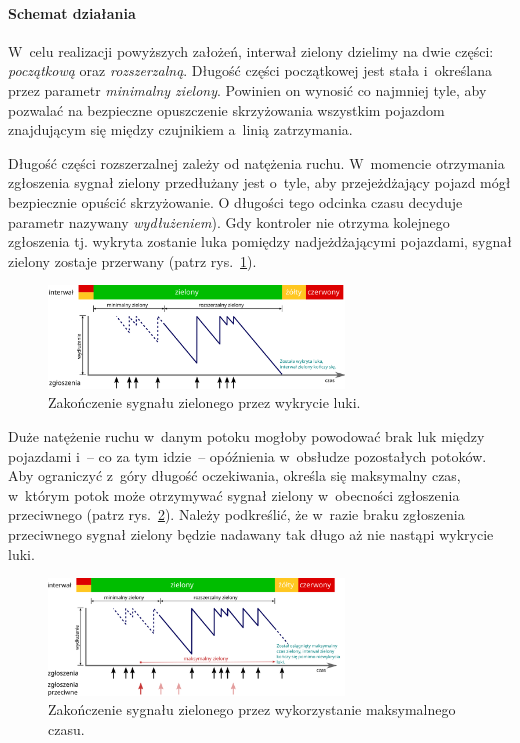\documentclass{pracamgr}
\newcommand{\imgr}[1]{rys.~\ref{#1}}
\theoremstyle{plain}
\begin{document}
\paragraph{Schemat działania} W~celu realizacji powyższych założeń,
interwał zielony dzielimy na dwie części: \emph{początkową} oraz
\emph{rozszerzalną}. Długość części początkowej jest stała i~określana
przez parametr \emph{minimalny zielony}. Powinien on wynosić co
najmniej tyle, aby pozwalać na bezpieczne opuszczenie skrzyżowania
wszystkim pojazdom znajdującym się między czujnikiem a~linią
zatrzymania.

Długość części rozszerzalnej zależy od natężenia ruchu. W~momencie
otrzymania zgłoszenia sygnał zielony przedłużany jest o~tyle, aby
przejeżdżający pojazd mógł bezpiecznie opuścić skrzyżowanie. O
długości tego odcinka czasu decyduje parametr nazywany
\emph{wydłużeniem}). Gdy kontroler nie otrzyma kolejnego
zgłoszenia tj. wykryta zostanie luka pomiędzy nadjeżdżającymi
pojazdami, sygnał zielony zostaje przerwany (patrz
\imgr{img:gap-out}).

\begin{figure}[h] \centering
  \includegraphics[width=0.7\textwidth]{img/signals-gap-out}
  \caption{Zakończenie sygnału zielonego przez wykrycie luki.}
\label{img:gap-out}
\end{figure}

Duże natężenie ruchu w~danym potoku mogłoby powodować brak luk między
pojazdami i~-- co za tym idzie~-- opóźnienia w~obsłudze
pozostałych potoków. Aby ograniczyć z~góry długość oczekiwania, określa
się maksymalny czas, w~którym potok może otrzymywać sygnał zielony
w~obecności zgłoszenia przeciwnego (patrz \imgr{img:max-out}). Należy
podkreślić, że w~razie braku zgłoszenia przeciwnego sygnał zielony
będzie nadawany tak długo aż nie nastąpi wykrycie luki.
\begin{figure}[h] \centering
  \includegraphics[width=0.7\textwidth]{img/signals-max-out}
  \caption{Zakończenie sygnału zielonego przez wykorzystanie
maksymalnego czasu.}
\label{img:max-out}
\end{figure}
\end{document}
